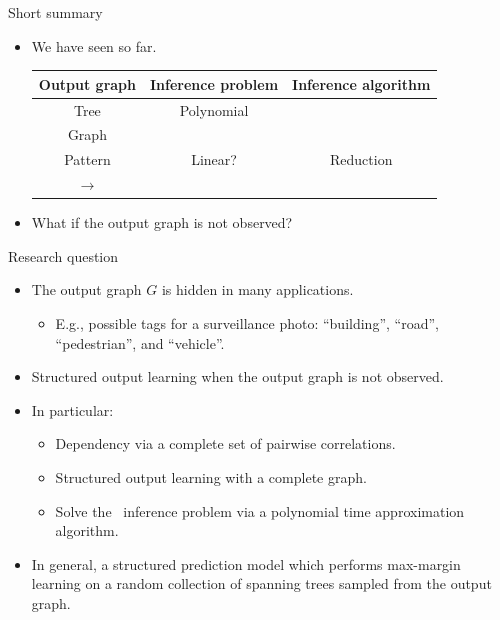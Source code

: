 \documentclass[first=dgreen,second=purple,logo=red]{aaltoslides}
\begin{document}
%
\begin{frame}{Short summary}
	\begin{itemize}\footnotesize
		\item We have seen so far. 
		\begin{tabular}{|c|c|c|}
			\hline
			\footnotesize
			 Output graph & Inference problem & Inference algorithm \\ \hline
			 Tree & Polynomial & \dpg\ \cite{Rousu07}  \\
			 Graph & \nphard & \lbp\ \cite{su10structured}  \\ 
			 Pattern & Linear? & Reduction \cite{su2015transporter} \\ \hline
			 $\rightarrow$ \daggraph & \nphard & \sdp\ \cite{su14structured} \\ \hline
		\end{tabular}
		\item What if the output graph is not observed?
	\end{itemize}
\end{frame}
%
\begin{frame}{Research question}
	\begin{itemize}\footnotesize
		\item The output graph $G$ is hidden in many applications.
		\begin{itemize}\footnotesize
			\item E.g., possible tags for a surveillance photo: ``building'', ``road'', ``pedestrian'', and ``vehicle''.
		\end{itemize}
		\item Structured output learning when the output graph is not observed.
		\item In particular:
		\begin{itemize}\footnotesize
			\item Dependency via a complete set of pairwise correlations.
			\item Structured output learning with a complete graph.
			\item Solve the \nphard\ inference problem via a polynomial time approximation algorithm.
		\end{itemize}
		\item In general, a structured prediction model which performs max-margin learning on a random collection of spanning trees sampled from the output graph.
	\end{itemize}
\end{frame}
\end{document}
